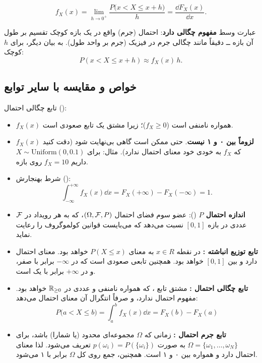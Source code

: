 \begin{definition}
\[
f_X(x)=\lim_{h\to0^+}\frac{P\big(x<X\le x+h\big)}{h}=\frac{\dd F_X(x)}{\dd x}.
\]
\end{definition}
عبارت وسط \textbf{مفهوم چگالی دارد}: احتمال (جرم) واقع در یک بازه کوچک تقسیم بر طول آن بازه ــ دقیقاً مانند چگالی جرم در فیزیک (جرم بر واحد طول). به بیان دیگر، برای $h$ کوچک:
\[
P(x<X\le x+h)\approx f_X(x)\,h .
\]

\subsection{خواص و مقایسه با سایر توابع}
تابع چگالی احتمال ():
\begin{itemize}
\item $f_X(x)$ همواره نامنفی است ($f_X\ge0$)؛ زیرا مشتق یک تابع صعودی است.
\item $f_X(x)$ \textbf{لزوماً بین ۰ و ۱ نیست}. حتی ممکن است گاهی بی‌نهایت شود (\textcolor{red!70!black}{دقت کنید که $f_X$ به خودی خود معنای احتمال ندارد}). مثال: برای $X\sim\mathrm{Uniform}(0,0.1)$ داریم $f_X=10$ روی بازه.
\item شرط بهنجارش ():
\[
\int_{-\infty}^{+\infty}f_X(x)\dd x=F_X(+\infty)-F_X(-\infty)=1 .
\]
\end{itemize}

\begin{summarybox}
\begin{itemize}
\item \textbf{اندازه احتمال $P$} (): عضو سوم فضای احتمال $(\Omega,\mathcal{F},P)$، که به هر رویداد در $\mathcal{F}$ عددی در بازه $[0,1]$ نسبت می‌دهد که می‌بایست قوانین کولموگروف را رعایت نماید.
\item \textbf{تابع توزیع انباشته :} در نقطه $x\in R$ به معنای $P(X\le x)$ خواهد بود.  معنای احتمال دارد و بین $[0,1]$ خواهد بود. همچنین تابعی صعودی است که در $-\infty$ برابر با صفر، و در $+\infty$ برابر با یک است.
\item \textbf{تابع چگالی احتمال :} مشتق تابع ، که همواره نامنفی و عددی در $\mathbb{R}_{\ge0}$ خواهد بود.  مفهوم احتمال ندارد، و صرفاً انتگرال آن معنای احتمال می‌دهد:
\[
\boxed{\ P\big(a<X\le b\big)=\int_a^bf_X(x)\dd x=F_X(b)-F_X(a)\ }
\]
\item \textbf{تابع جرم احتمال :} زمانی که $\Omega$ مجموعه‌ای محدود (یا شمارا) باشد، برای $\Omega=\{\omega_1,\ldots,\omega_N\}$ به صورت $p(\omega_i)=P(\{\omega_i\})$ تعریف می‌شود. لذا معنای احتمال دارد و همواره بین ۰ و ۱ است. همچنین، جمع  روی کل $\Omega$ برابر با ۱ می‌شود.
\end{itemize}
\end{summarybox}

